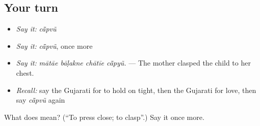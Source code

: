 \subsection*{Your turn}
\begin{itemize}
\raggedright
  \item \emph{Say it:} \emph{cā̃pvũ}
  \item \emph{Say it:} \emph{cā̃pvũ}, once more
  \item \emph{Say it:} \emph{mātāe bāḷakne chātīe cā̃pyũ.} — The mother clasped the child to her chest.
  \item \emph{Recall:} say the Gujarati for to hold on tight, then the Gujarati for love, then say \emph{cā̃pvũ} again
\end{itemize}

\begin{tcolorbox}[breakable,colback=teal!4,colframe=teal!35!black,title={Before you move on}]
What does  mean? (\textquotedblleft{}To press close; to clasp\textquotedblright{}.) Say it once more.
\end{tcolorbox}
